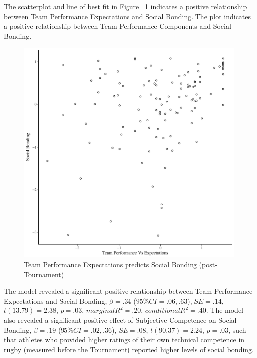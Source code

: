 \begin{CJK}{UTF8}{gbsn}
The scatterplot and line of best fit in Figure ~\ref{fig:teamPerfBondBasicXY} indicates a positive relationship between Team Performance Expectations and Social Bonding. The plot indicates a positive relationship between Team Performance Components and Social Bonding.

  \begin{figure}[htbp]
    \centering
  \includegraphics[scale=.5]{images/teamPerfBondBasicXY.pdf}
    \caption{Team Performance Expectations predicts Social Bonding (post-Tournament)}
    \label{fig:teamPerfBondBasicXY}
  \end{figure}

The model revealed a significant positive relationship between Team Performance Expectations and Social Bonding, $\beta = .34$ ($95\% CI =  .06, .63$), $SE = .14$, $t(13.79) = 2.38$, $p = .03$, $marginal R^2 = .20$, $conditional R^2 = .40$.  The model also revealed a significant positive effect of Subjective Competence on Social Bonding, $\beta = .19$ ($95\% CI =  .02, .36$), $SE = .08$, $t(90.37) = 2.24$, $p = .03$, such that athletes who provided higher ratings of their own technical competence in rugby (measured before the Tournament) reported higher levels of social bonding.


\end{CJK}
